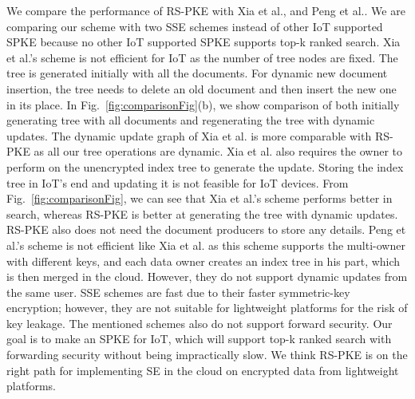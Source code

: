 \documentclass[sigconf,pdftex]{acmart}
\begin{document}
We compare the performance of RS-PKE with Xia et al.\cite{xia2015secure}, and Peng et al.\cite{peng2018efficient}. We are comparing our scheme with two SSE schemes instead of other IoT supported SPKE because no other IoT supported SPKE supports top-k ranked search. Xia et al.'s scheme is not efficient for IoT as the number of tree nodes are fixed. The tree is generated initially with all the documents. For dynamic new document insertion, the tree needs to delete an old document and then insert the new one in its place. In Fig.~\ref{fig:comparisonFig}(b), we show comparison of both initially generating tree with all documents and regenerating the tree with dynamic updates. The dynamic update graph of Xia et al. is more comparable with RS-PKE as all our tree operations are dynamic. Xia et al. also requires the owner to perform on the unencrypted index tree to generate the update. Storing the index tree in IoT's end and updating it is not feasible for IoT devices. From Fig.~\ref{fig:comparisonFig}, we can see that Xia et al.'s \cite{xia2015secure} scheme performs better in search, whereas RS-PKE is better at generating the tree with dynamic updates. RS-PKE also does not need the document producers to store any details. Peng et al.'s \cite{peng2018efficient} scheme is not efficient like Xia et al. as this scheme supports the multi-owner with different keys, and each data owner creates an index tree in his part, which is then merged in the cloud. However, they do not support dynamic updates from the same user. SSE schemes are fast due to their faster symmetric-key encryption; however, they are not suitable for lightweight platforms for the risk of key leakage. The mentioned schemes also do not support forward security. Our goal is to make an SPKE for IoT, which will support top-k ranked search with forwarding security without being impractically slow. We think RS-PKE is on the right path for implementing SE in the cloud on encrypted data from lightweight platforms.
\end{document}
